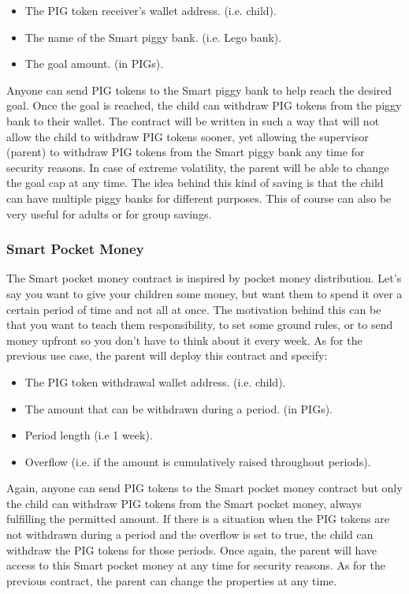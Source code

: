 \documentclass[english]{article}
\begin{document}
\begin{itemize}
  \item The PIG token receiver’s wallet address. (i.e. child).
  \item The name of the Smart piggy bank. (i.e. Lego bank).
  \item The goal amount. (in PIGs).
\end{itemize}

Anyone can send PIG tokens to the Smart piggy bank to help reach the desired goal. Once the goal is reached, the child can withdraw PIG tokens from the piggy bank to their wallet. The contract will be written in such a way that will not allow the child to withdraw PIG tokens sooner, yet allowing the supervisor (parent) to withdraw PIG tokens from the Smart piggy bank any time for security reasons. In case of extreme volatility, the parent will be able to change the goal cap at any time. The idea behind this kind of saving is that the child can have multiple piggy banks for different purposes. This of course can also be very useful for adults or for group savings. 

\subsubsection{Smart Pocket Money}
The Smart pocket money contract is inspired by pocket money distribution. Let's say you want to give your children some money, but want them to spend it over a certain period of time and not all at once. The motivation behind this can be that you want to teach them responsibility, to set some ground rules, or to send money upfront so you don't have to think about it every week. As for the previous use case, the parent will deploy this contract and specify:

\begin{itemize}
  \item The PIG token withdrawal wallet address. (i.e. child).
  \item The amount that can be withdrawn during a period. (in PIGs).
  \item Period length (i.e 1 week).
  \item Overflow (i.e. if the amount is cumulatively raised throughout periods).
\end{itemize}

Again, anyone can send PIG tokens to the Smart pocket money contract but only the child can withdraw PIG tokens from the Smart pocket money, always fulfilling the permitted amount. If there is a situation when the PIG tokens are not withdrawn during a period and the overflow is set to true, the child can withdraw the PIG tokens for those periods. Once again, the parent will have access to this Smart pocket money at any time for security reasons. As for the previous contract, the parent can change the properties at any time. 
\end{document}
